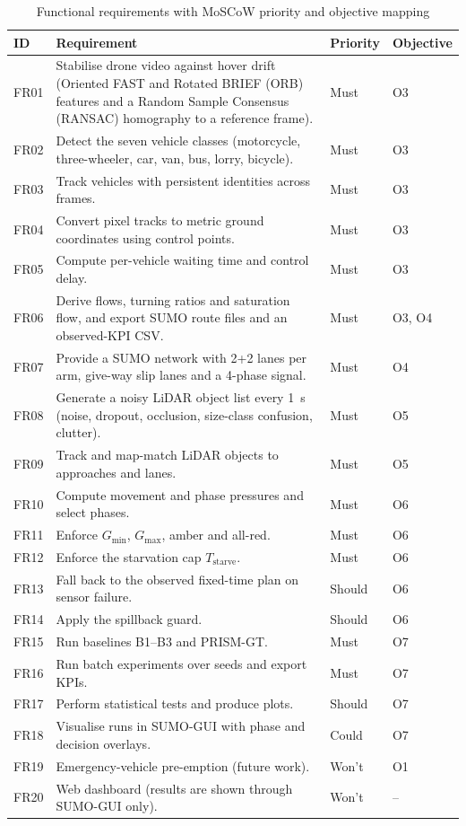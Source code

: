 \begin{table}[htbp]
\centering
\caption{Functional requirements with MoSCoW priority and objective mapping}
\label{tab:srs-fr}
\small
\renewcommand{\arraystretch}{1.1}
\begin{tabularx}{\textwidth}{@{}p{1.0cm}>{\raggedright\arraybackslash}Xp{1.3cm}p{1.65cm}@{}}
\toprule
\textbf{ID} & \textbf{Requirement} & \textbf{Priority} & \textbf{Objective}\\
\midrule
FR01 & Stabilise drone video against hover drift (Oriented FAST and Rotated BRIEF (ORB) features and a Random Sample Consensus (RANSAC) homography to a reference frame). & Must & O3\\
FR02 & Detect the seven vehicle classes (motorcycle, three-wheeler, car, van, bus, lorry, bicycle). & Must & O3\\
FR03 & Track vehicles with persistent identities across frames. & Must & O3\\
FR04 & Convert pixel tracks to metric ground coordinates using control points. & Must & O3\\
FR05 & Compute per-vehicle waiting time and control delay. & Must & O3\\
FR06 & Derive flows, turning ratios and saturation flow, and export SUMO route files and an observed-KPI CSV. & Must & O3, O4\\
FR07 & Provide a SUMO network with 2+2 lanes per arm, give-way slip lanes and a 4-phase signal. & Must & O4\\
FR08 & Generate a noisy LiDAR object list every 1~s (noise, dropout, occlusion, size-class confusion, clutter). & Must & O5\\
FR09 & Track and map-match LiDAR objects to approaches and lanes. & Must & O5\\
FR10 & Compute movement and phase pressures and select phases. & Must & O6\\
FR11 & Enforce $G_{\min}$, $G_{\max}$, amber and all-red. & Must & O6\\
FR12 & Enforce the starvation cap $T_{\mathrm{starve}}$. & Must & O6\\
FR13 & Fall back to the observed fixed-time plan on sensor failure. & Should & O6\\
FR14 & Apply the spillback guard. & Should & O6\\
FR15 & Run baselines B1--B3 and PRISM-GT. & Must & O7\\
FR16 & Run batch experiments over seeds and export KPIs. & Must & O7\\
FR17 & Perform statistical tests and produce plots. & Should & O7\\
FR18 & Visualise runs in SUMO-GUI with phase and decision overlays. & Could & O7\\
FR19 & Emergency-vehicle pre-emption (future work). & Won't & O1\\
FR20 & Web dashboard (results are shown through SUMO-GUI only). & Won't & --\\
\bottomrule
\end{tabularx}
\end{table}

